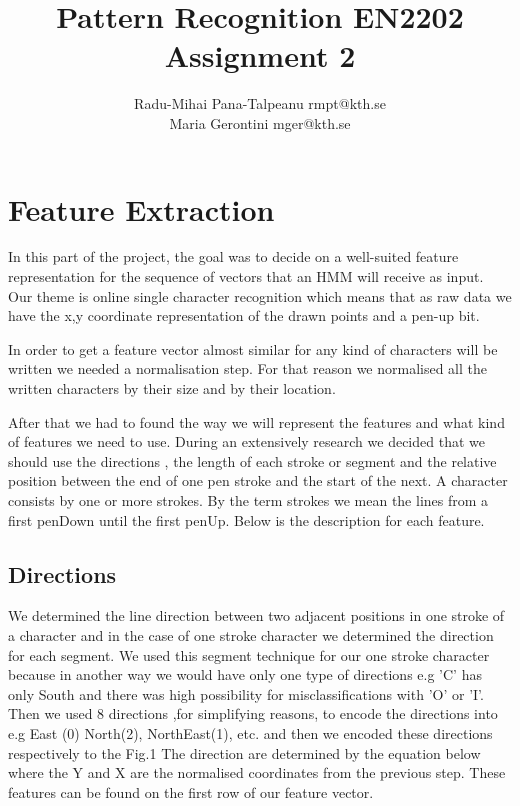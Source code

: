 \documentclass[a4paper, 10pt]{article}
\begin{document}
\title {Pattern Recognition EN2202 \\ Assignment 2}
\author{Radu-Mihai Pana-Talpeanu rmpt@kth.se \\Maria Gerontini mger@kth.se}
\maketitle

\section{Feature Extraction}
In this part of the project, the goal was to decide on a well-suited feature representation for the sequence of vectors that an HMM will receive as input. Our theme is online single character recognition which means that as raw data we have the x,y coordinate representation of the drawn points and a pen-up bit.

In order to get a feature vector almost similar for any kind of characters will be written we needed a normalisation step. For that reason we normalised all the written characters by their size and by their location. 

After that we had to found the way we will represent the features and what kind of features we need to use. During an extensively research we decided that we should use the directions , the length of each stroke or segment and the relative position between the end of one pen stroke and the start of the next.  A character consists by one or more strokes. By the term strokes we mean the lines from a first penDown until the first penUp. Below is the description for each feature.

\subsection{Directions}
We determined the line direction between two adjacent positions in one stroke of a character and in the case of one stroke character we determined the direction for each segment.  We used this segment technique for our one stroke character because in another way we would have only one type of directions  e.g 'C' has only South and there was high possibility for misclassifications with 'O' or 'I'.  Then we used 8 directions ,for simplifying  reasons, to encode the directions into e.g East (0) North(2), NorthEast(1), etc. and then we encoded these directions respectively to the Fig.1 The direction are determined by the equation below where the Y and X are the normalised coordinates from the previous step.  These features can be found on the first row of our feature vector.
\end{document}
